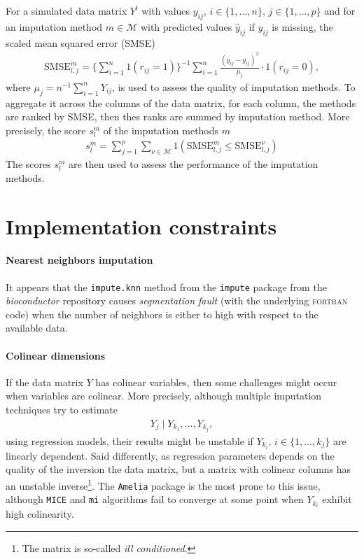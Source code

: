 For a simulated data matrix $Y^l$ with values
$y_{ij},\, i \in \{1, \dots, n\},\, j \in \{1, \dots, p\}$ and for an
imputation method $m \in \mathcal{M}$ with predicted values $\hat y_{ij}$ if
$y_{ij}$ is missing, the scaled mean squared error (SMSE)
\begin{align*}
  \textrm{SMSE}^{m}_{l,j} = \Big\{\sum_{i=1}^n 1(r_{ij}=1)\Big\}^{-1} \sum_{i=1}^{n} \frac{(\hat y_{ij} - y_{ij})^2}{\mu_j} \cdot 1(r_{ij}=0),
\end{align*}
where $\mu_j = n^{-1}\sum_{i=1}^n Y_{ij}$, is used to assess the quality of
imputation methods. To aggregate it across the columns of the data matrix,
for each column, the methods are ranked by SMSE, then thes ranks are summed by
imputation method. More precisely, the score $s^m_l$ of the imputation methods
$m$
\begin{align} \label{eq:score:imputation}
  s^{m}_{l} = \sum_{j=1}^p \sum_{\nu \in \mathcal{M}} 1(\textrm{SMSE}^{m}_{l,j} \leq \textrm{SMSE}^{\nu}_{l,j})
\end{align}
The scores $s^m_l$ are then used to assess the performance of the imputation
methods.

\section{Implementation constraints}

\paragraph{Nearest neighbors imputation}
It appears that the \texttt{impute.knn} method from the \texttt{impute} package
from the \emph{bioconductor} repository causes \emph{segmentation fault} (with
the underlying \textsc{fortran} code) when the number of neighbors is either to
high with respect to the available data.

\paragraph{Colinear dimensions}

If the data matrix $Y$ has colinear variables, then some challenges might occur
when variables are colinear. More precisely, although multiple imputation
techniques try to estimate
\begin{align*}
  Y_j \; |\; Y_{k_1}, \dots, Y_{k_j},
\end{align*}
using regression models, their results might be unstable if
$Y_{k_i},\, i \in \{1, \dots, k_j\}$ are linearly dependent. Said differently, as
regression parameters depends on the quality of the inversion the data matrix,
but a matrix with colinear columns has an unstable inverse\footnote{The matrix
  is so-called \emph{ill conditioned}.}. The \texttt{Amelia}
package is the most prone to this issue, although \texttt{MICE} and \texttt{mi}
algorithms fail to converge at some point when $Y_{k_i}$ exhibit high
colinearity.

